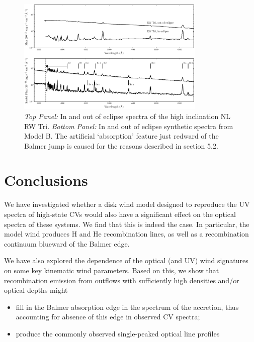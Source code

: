 \documentclass[preprint, a4paper, 11pt]{aastex}
\begin{document}
\begin{figure} %
\includegraphics[width=0.8\textwidth]{figures/fig13_eclipse.eps}
\caption{{\sl Top Panel:} In and out of eclipse spectra of the high
inclination NL RW Tri. {\sl Bottom Panel:} In and out of eclipse synthetic
spectra from Model B.
The artificial `absorption' feature just redward of the Balmer jump
is caused for the reasons described in section 5.2.}
\label{rwtricomp}
\end{figure} %








%
%


\section{Conclusions}

We have investigated whether a disk wind model designed to reproduce
the UV spectra of high-state CVs would also have a significant effect
on the optical spectra of these systems. We find that this is indeed
the case. In particular, the model wind produces H and He
recombination lines, as well as a recombination continuum blueward of
the Balmer edge. 

We have also explored the dependence of the optical (and UV) wind
signatures on some key kinematic wind parameters. Based on this, we
show that recombination emission from outflows with sufficiently high
densities and/or optical depths might 
\renewcommand{\labelitemi}{$\bullet$}
\begin{itemize}
	\item fill in the Balmer absorption edge in the spectrum of
          the accretion, thus accounting for absence of this edge in
          observed CV spectra\citep{KLWB98};
	\item produce the commonly observed single-peaked optical line
          profiles \citep{MC96}
\end{itemize}
\smallskip
\end{document}
